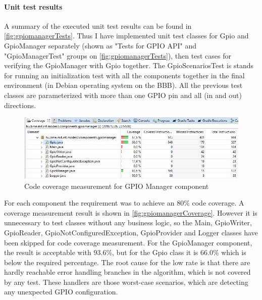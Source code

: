 \paragraph{Unit test results} A summary of the executed unit test results can be found in \autoref{fig:gpiomanagerTests}. Thus I have implemented unit test classes for Gpio and GpioManager separately (shown as "Tests for GPIO API" and "GpioManagerTest" groups on \autoref{fig:gpiomanagerTests}), then test cases for verifying the GpioManager with Gpio together. The GpioScenariosTest is stands for running an initialization test with all the components together in the final environment (in Debian operating system on the BBB). All the previous test classes are parameterized with more than one GPIO pin and all (in and out) directions.

\begin{figure}[ht]
	\centering
	\includegraphics[width=150mm, keepaspectratio]{figures/impl/gpioCoverage.png}
	\caption{Code coverage measurement for GPIO Manager component}
	\label{fig:gpiomanagerCoverage}
\end{figure}
For each component the requirement was to achieve an 80\% code coverage. A coverage measurement result is shown in \autoref{fig:gpiomanagerCoverage}. However it is unnecessary to test classes without any business logic, so the Main, GpioWriter, GpioReader, GpioNotConfiguredException, GpioProvider and Logger classes have been skipped for code coverage measurement. For the GpioManager component, the result is acceptable with 93.6\%, but for the Gpio class it is 66.0\% which is below the required percentage. The root cause for the low rate is that there are hardly reachable error handling branches in the algorithm, which is not covered by any test. These handlers are those worst-case scenarios, which are detecting any unexpected GPIO configuration.

